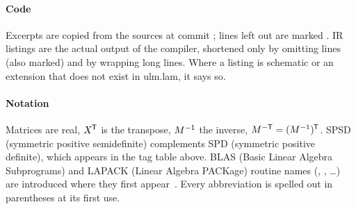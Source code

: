 \documentclass[11pt,a4paper,openany]{book}
\begin{document}
\paragraph{Code} Excerpts are copied from the sources at commit
\texttt{\shortcommit}; lines left out are marked . IR listings are
the actual output of the compiler, shortened only by omitting lines (also
marked) and by wrapping long lines. Where a listing is schematic or an
extension that does not exist in ulm.lam, it says so.

\paragraph{Notation} Matrices are real, \(X^{\mkern-1.5mu\mathsf{T}}\) is the transpose,
\(M^{-1}\) the inverse, \(M^{-\mathsf{T}} = (M^{-1})^{\mkern-1.5mu\mathsf{T}}\). SPSD (symmetric positive
semidefinite) complements SPD (symmetric positive definite), which appears in
the tag table above. BLAS (Basic
Linear Algebra Subprograms) and LAPACK (Linear Algebra PACKage) routine names
(, , \ldots) are introduced where they first appear~\cite{blas3,lapack}.
Every abbreviation is spelled out in parentheses at its first use.

\tableofcontents

\mainmatter










\appendix


\backmatter

\end{document}

